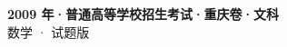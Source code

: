 \documentclass[zihao=-4, a4paper]{ctexart}
\begin{document}
\begin{center}
  {\Large\bfseries 2009 年·普通高等学校招生考试·重庆卷·文科}\\[4pt]
  {\large 数学 · 试题版}
\end{center}
\medskip
{}

\end{document}
